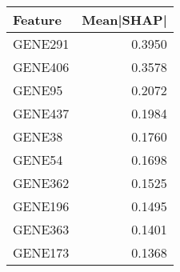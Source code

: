 \begin{tabular}{lr}
\toprule
Feature & Mean|SHAP| \\
\midrule
GENE291 & 0.3950 \\
GENE406 & 0.3578 \\
GENE95 & 0.2072 \\
GENE437 & 0.1984 \\
GENE38 & 0.1760 \\
GENE54 & 0.1698 \\
GENE362 & 0.1525 \\
GENE196 & 0.1495 \\
GENE363 & 0.1401 \\
GENE173 & 0.1368 \\
\bottomrule
\end{tabular}
